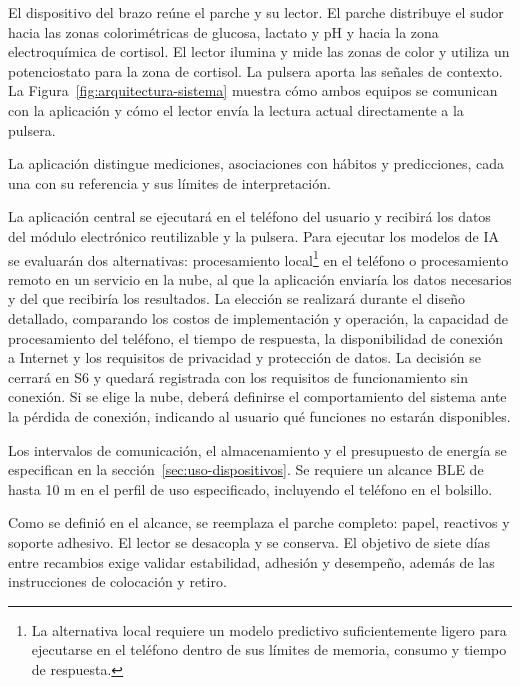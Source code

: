 El dispositivo del brazo reúne el parche y su lector. El parche distribuye el sudor hacia las zonas colorimétricas de glucosa, lactato y pH y hacia la zona electroquímica de cortisol. El lector ilumina y mide las zonas de color y utiliza un potenciostato para la zona de cortisol. La pulsera aporta las señales de contexto. La Figura~\ref{fig:arquitectura-sistema} muestra cómo ambos equipos se comunican con la aplicación y cómo el lector envía la lectura actual directamente a la pulsera.

La aplicación distingue mediciones, asociaciones con hábitos y predicciones, cada una con su referencia y sus límites de interpretación.

La aplicación central se ejecutará en el teléfono del usuario y recibirá los datos del módulo electrónico reutilizable y la pulsera. Para ejecutar los modelos de IA se evaluarán dos alternativas: procesamiento local\footnote{La alternativa local requiere un modelo predictivo suficientemente ligero para ejecutarse en el teléfono dentro de sus límites de memoria, consumo y tiempo de respuesta.} en el teléfono o procesamiento remoto en un servicio en la nube, al que la aplicación enviaría los datos necesarios y del que recibiría los resultados. La elección se realizará durante el diseño detallado, comparando los costos de implementación y operación, la capacidad de procesamiento del teléfono, el tiempo de respuesta, la disponibilidad de conexión a Internet y los requisitos de privacidad y protección de datos. La decisión se cerrará en S6 y quedará registrada con los requisitos de funcionamiento sin conexión. Si se elige la nube, deberá definirse el comportamiento del sistema ante la pérdida de conexión, indicando al usuario qué funciones no estarán disponibles.

Los intervalos de comunicación, el almacenamiento y el presupuesto de energía se especifican en la sección~\ref{sec:uso-dispositivos}. Se requiere un alcance BLE de hasta 10 m en el perfil de uso especificado, incluyendo el teléfono en el bolsillo.

Como se definió en el alcance, se reemplaza el parche completo: papel, reactivos y soporte adhesivo. El lector se desacopla y se conserva. El objetivo de siete días entre recambios exige validar estabilidad, adhesión y desempeño, además de las instrucciones de colocación y retiro.

